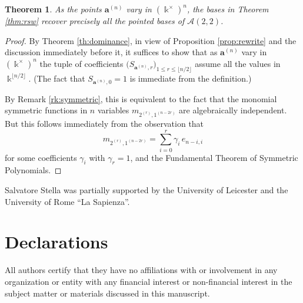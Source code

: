 \documentclass[pdflatex,sn-mathphys]{sn-jnl}%
\theoremstyle{thmstyleone}%
\newtheorem{theorem}{Theorem}[section]%
\theoremstyle{thmstyletwo}%
\theoremstyle{thmstylethree}%
\newcommand{\bfa}{\boldsymbol{a}}
\newcommand{\cA}{\mathcal{A}}
\newcommand{\kk}{\Bbbk}
\begin{document}
  \begin{theorem}
    As the points $\bfa^{(n)}$ vary in $(\kk^\times)^n$, the bases in Theorem \ref{thm:rsw} recover precisely all the pointed bases of $\cA(2,2)$.
  \end{theorem}
  \begin{proof}
    By Theorem \ref{th:dominance}, in view of Proposition \ref{prop:rewrite} and the discussion immediately before it, it suffices to show that as $\bfa^{(n)}$ vary in $(\kk^\times)^n$ the tuple of coefficients $\big(S_{\bfa^{(n)},r}\big)_{1\leq r \leq \lfloor n/2\rfloor}$ assume all the values in $\kk^{\lfloor n/2\rfloor}$.
    (The fact that $S_{\bfa^{(n)},0}=1$ is immediate from the definition.)

    By Remark \ref{rk:symmetric}, this is equivalent to the fact that the monomial symmetric functions in $n$ variables $m_{2^{(r)},1^{(n-2r)}}$ are algebraically independent.
    But this follows immediately from the observation that 
    \[ 
      m_{2^{(r)},1^{(n-2r)}} = \sum_{i=0}^r \gamma_i\, e_{n-i,i}
    \]
    for some coefficients $\gamma_i$ with $\gamma_r=1$, and the Fundamental Theorem of Symmetric Polynomials. 
  \end{proof}


Salvatore Stella was partially supported by the University of Leicester and the University of Rome ``La Sapienza''.

\section*{Declarations}

All authors certify that they have no affiliations with or involvement in any organization or entity with any financial interest or non-financial interest in the subject matter or materials discussed in this manuscript.




\end{document}
